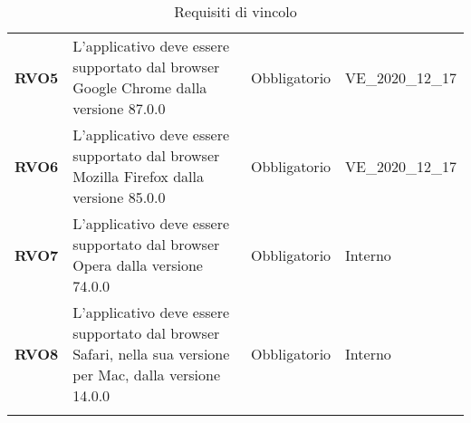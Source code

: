 \begin{longtable}[H]{| >{\raggedright\bfseries}m{20mm} | >{\raggedright}m{90mm} | >{\centering}m{25mm} | >{\centering\arraybackslash}m{30mm}|}
    RVO5
        & L'applicativo deve essere supportato dal browser Google Chrome dalla versione 87.0.0
        & Obbligatorio
        & VE\_2020\_12\_17 \\

    RVO6
        & L'applicativo deve essere supportato dal browser Mozilla Firefox dalla versione 85.0.0
        & Obbligatorio
        & VE\_2020\_12\_17 \\

    RVO7
        & L'applicativo deve essere supportato dal browser Opera dalla versione 74.0.0
        & Obbligatorio
        & Interno \\

    RVO8
        & L'applicativo deve essere supportato dal browser Safari, nella sua versione per Mac, dalla versione 14.0.0
        & Obbligatorio
        & Interno \\


    \hline
    \rowcolor{white}
    \caption{Requisiti di vincolo}%
    \label{tab:requisiti_di_vincolo}
\end{longtable}
